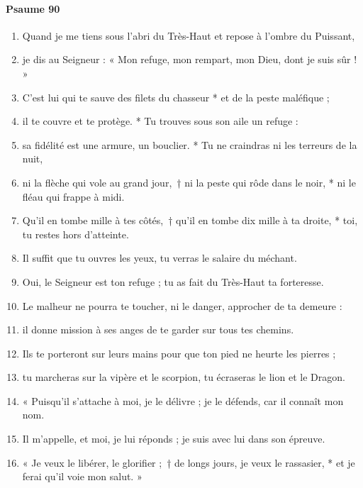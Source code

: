 \documentclass[twoside]{article}
\begin{document}
\begin{paracol}[1]{2}
\paragraph{Psaume 90}
\begin{enumerate}[wide, itemsep=0mm, labelwidth=!, labelindent=0pt, label=\color{gregoriocolor}\theenumi]
\item Quand je me tiens sous l'abri du Très-Haut
et repose à l'ombre du Puissant,
\item  je dis au Seigneur : « Mon refuge,
mon rempart, mon Dieu, dont je suis sûr ! »

\item  C'est lui qui te sauve des filets du chasseur *
et de la peste maléfique ;
\item il te couvre et te protège. *
Tu trouves sous son aile un refuge :
\item sa fidélité est une armure, un bouclier. *
Tu ne craindras ni les terreurs de la nuit,

\item ni la flèche qui vole au grand jour,~†
  ni la peste qui rôde dans le noir, *
ni le fléau qui frappe à midi.

\item  Qu'il en tombe mille à tes côtés,~†
qu'il en tombe dix mille à ta droite, *
toi, tu restes hors d'atteinte.

\item  Il suffit que tu ouvres les yeux,
tu verras le salaire du méchant.
\item  Oui, le Seigneur est ton refuge ;
tu as fait du Très-Haut ta forteresse.

\item  Le malheur ne pourra te toucher,
ni le danger, approcher de ta demeure :
\item  il donne mission à ses anges
de te garder sur tous tes chemins.

\item  Ils te porteront sur leurs mains
pour que ton pied ne heurte les pierres ;
\item  tu marcheras sur la vipère et le scorpion,
tu écraseras le lion et le Dragon.

\item  « Puisqu'il s'attache à moi, je le délivre ;
je le défends, car il connaît mon nom.
\item  Il m'appelle, et moi, je lui réponds ;
je suis avec lui dans son épreuve.

\item « Je veux le libérer, le glorifier ;~†
de longs jours, je veux le rassasier, *
et je ferai qu'il voie mon salut. »
\end{enumerate}
\switchcolumn*


\end{paracol}
\end{document}

